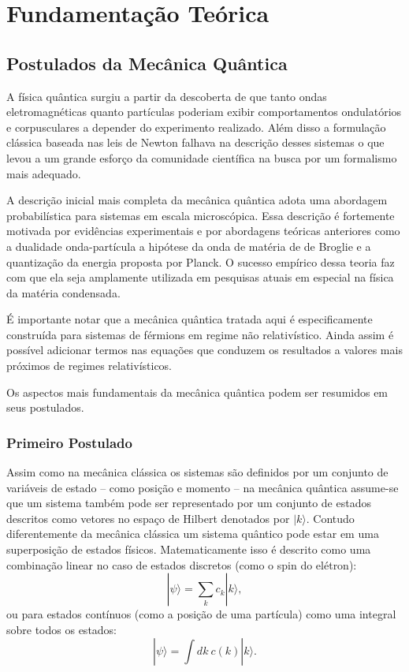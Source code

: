 \chapter{Fundamentação Teórica}

\section{Postulados da Mecânica Quântica}

A física quântica surgiu a partir da descoberta de que tanto ondas eletromagnéticas quanto partículas poderiam exibir comportamentos ondulatórios e corpusculares a depender do experimento realizado. Além disso a formulação clássica baseada nas leis de Newton falhava na descrição desses sistemas o que levou a um grande esforço da comunidade científica na busca por um formalismo mais adequado.

A descrição inicial mais completa da mecânica quântica adota uma abordagem probabilística para sistemas em escala microscópica. Essa descrição é fortemente motivada por evidências experimentais e por abordagens teóricas anteriores como a dualidade onda-partícula a hipótese da onda de matéria de de Broglie e a quantização da energia proposta por Planck. O sucesso empírico dessa teoria faz com que ela seja amplamente utilizada em pesquisas atuais em especial na física da matéria condensada.

É importante notar que a mecânica quântica tratada aqui é especificamente construída para sistemas de férmions em regime não relativístico. Ainda assim é possível adicionar termos nas equações que conduzem os resultados a valores mais próximos de regimes relativísticos.

Os aspectos mais fundamentais da mecânica quântica podem ser resumidos em seus postulados.

\subsection{Primeiro Postulado}

Assim como na mecânica clássica os sistemas são definidos por um conjunto de variáveis de estado – como posição e momento – na mecânica quântica assume-se que um sistema também pode ser representado por um conjunto de estados descritos como vetores no espaço de Hilbert denotados por $|k\rangle$. Contudo diferentemente da mecânica clássica um sistema quântico pode estar em uma superposição de estados físicos. Matematicamente isso é descrito como uma combinação linear no caso de estados discretos (como o spin do elétron):
\begin{equation}
|\psi\rangle = \sum_k c_k |k\rangle,
\end{equation}
ou para estados contínuos (como a posição de uma partícula) como uma integral sobre todos os estados:
\begin{equation}
|\psi \rangle = \int dk ~c(k) |k \rangle.
\end{equation}


